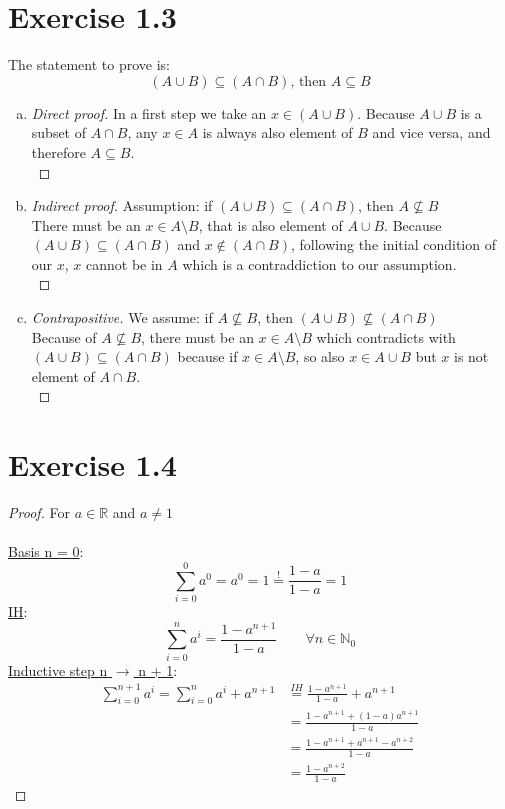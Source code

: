 \documentclass{article} %
\newcommand{\homeworkNumber}{1}
\begin{document}
\section*{Exercise \homeworkNumber.3}
The statement to prove is:
$$(A \cup B) \subseteq (A \cap B) \text{, then } A \subseteq B$$
\begin{enumerate}[(a)]
	\item
	\begin{proof}[Direct proof]
		In a first step we take an $x \in (A \cup B)$. Because $A \cup B$ is a
		subset of $A \cap B$, any $x \in A$ is always also element of $B$ and
		vice versa, and therefore $A \subseteq B$.\\
	\end{proof}

	\item
	\begin{proof}[Indirect proof]
		Assumption: if $(A \cup B) \subseteq (A \cap B)$, then $A \nsubseteq B$\\
		There must be an $x \in A \setminus B$, that is also element of $A \cup B$.
		Because $(A \cup B) \subseteq (A \cap B)$ and $x \notin (A \cap B)$,
		following the initial condition of our $x$, $x$ cannot be in $A$ which
		is a contraddiction to our assumption.\\
	\end{proof}

	\item
	\begin{proof}[Contrapositive]
		We assume: if $A \nsubseteq B$, then $(A \cup B) \nsubseteq (A \cap B)$\\
		Because of $A \nsubseteq B$, there must be an $x \in A \setminus B$ which
		contradicts with $(A \cup B) \subseteq (A \cap B)$ because if $x \in A
		\setminus B$, so also $x \in A \cup B$ but $x$ is not element of $A \cap B$.\\
	\end{proof}
\end{enumerate}

\clearpage

\section*{Exercise \homeworkNumber.4}
\begin{proof}
	For $a \in \mathbb{R}$ and $a \neq 1$\\\\
	\underline{Basis n = 0}:
	$$
	\sum_{i = 0}^{0} a^0 = a^0 = 1 \stackrel{!}{=} \frac{1 - a}{1 - a} = 1
	$$
	\underline{IH}:
	$$
	\sum_{i = 0}^{n} a^i = \frac{1 - a^{n + 1}}{1 - a} \qquad \forall n \in \mathbb{N}_0
	$$
	\underline{Inductive step n $\to$ n + 1}:
	\begin{align*}
		\sum_{i = 0}^{n + 1} a^i = \sum_{i = 0}^{n} a^i + a^{n + 1} &\stackrel{IH}{=} \frac{1 - a^{n + 1}}{1 - a} + a^{n + 1} \\
			&= \frac{1 - a^{n + 1} + (1 - a)a^{n + 1}}{1 - a} \\
			&= \frac{1 - a^{n + 1} + a^{n + 1} - a^{n + 2}}{1 - a} \\
			&= \frac{1 - a^{n + 2}}{1 - a}
	\end{align*}
\end{proof}
\end{document}
